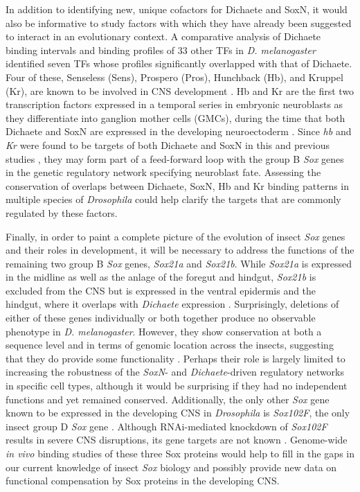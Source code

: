 In addition to identifying new, unique cofactors for Dichaete and SoxN, it would also be informative to study factors with which they have already been suggested to interact in an evolutionary context. A comparative analysis of Dichaete binding intervals and binding profiles of 33 other TFs in \emph{D. melanogaster} identified seven TFs whose profiles significantly overlapped with that of Dichaete. Four of these, Senseless (Sens), Prospero (Pros), Hunchback (Hb), and Kruppel (Kr), are known to be involved in CNS development \citep{aleksic_role_2013}. Hb and Kr are the first two transcription factors expressed in a temporal series in embryonic neuroblasts as they differentiate into ganglion mother cells (GMCs), during the time that both Dichaete and SoxN are expressed in the developing neuroectoderm \citep{buescher_formation_2002,maurange_brainy_2005,overton_evidence_2002}. Since \emph{hb} and \emph{Kr} were found to be targets of both Dichaete and SoxN in this and previous studies \citep{aleksic_role_2013,ferrero_soxneuro_2014}, they may form part of a feed-forward loop with the group B \emph{Sox} genes in the genetic regulatory network specifying neuroblast fate. Assessing the conservation of overlaps between Dichaete, SoxN, Hb and Kr binding patterns in multiple species of \emph{Drosophila} could help clarify the targets that are commonly regulated by these factors.

Finally, in order to paint a complete picture of the evolution of insect \emph{Sox} genes and their roles in development, it will be necessary to address the functions of the remaining two group B \emph{Sox} genes, \emph{Sox21a} and \emph{Sox21b}. While \emph{Sox21a} is expressed in the midline as well as the anlage of the foregut and hindgut, \emph{Sox21b} is excluded from the CNS but is expressed in the ventral epidermis and the hindgut, where it overlaps with \emph{Dichaete} expression \citep{cremazy_genome-wide_2001,mckimmie_conserved_2005,phochanukul_no_2010}. Surprisingly, deletions of either of these genes individually or both together produce no observable phenotype in \emph{D. melanogaster}. However, they show conservation at both a sequence level and in terms of genomic location across the insects, suggesting that they do provide some functionality \citep{mckimmie_conserved_2005}. Perhaps their role is largely limited to increasing the robustness of the \emph{SoxN}- and \emph{Dichaete}-driven regulatory networks in specific cell types, although it would be surprising if they had no independent functions and yet remained conserved. Additionally, the only other \emph{Sox} gene known to be expressed in the developing CNS in \emph{Drosophila} is \emph{Sox102F}, the only insect group D \emph{Sox} gene \citep{cremazy_genome-wide_2001,phochanukul_no_2010}. Although RNAi-mediated knockdown of \emph{Sox102F} results in severe CNS disruptions, its gene targets are not known \citep{phochanukul_no_2010}. Genome-wide \emph{in vivo} binding studies of these three Sox proteins would help to fill in the gaps in our current knowledge of insect \emph{Sox} biology and possibly provide new data on functional compensation by Sox proteins in the developing CNS.

